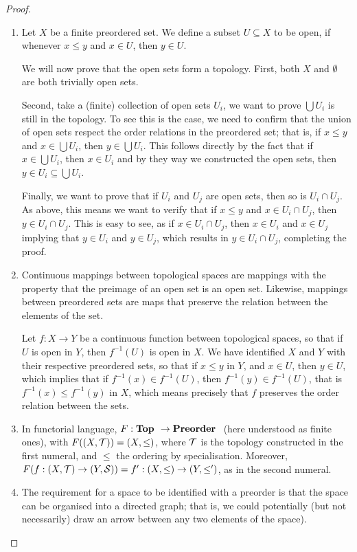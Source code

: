 \begin{proof}
\begin{enumerate}
    \item Let $X$ be a finite preordered set.
    We define a subset $U \subseteq X$ to be open, if whenever $x \leq y$ and $x \in U$, then $y \in U$.

    We will now prove that the open sets form a topology.
    First, both $X$ and $\emptyset$ are both trivially open sets.
    
    Second, take a (finite) collection of open sets $U_i$, we want to prove $\bigcup U_i$ is still in the topology. 
    To see this is the case, we need to confirm that the union of open sets respect the order relations in the preordered set;
    that is, if $x \leq y$ and $x \in \bigcup U_i$, then $y \in \bigcup U_i$.
    This follows directly by the fact that if $x \in \bigcup U_i$, then $x \in U_i$ and by they way we constructed the open sets, then $y \in U_i \subseteq \bigcup U_i$.
    
    Finally, we want to prove that if $U_i$ and $U_j$ are open sets, then so is $U_i \cap U_j$.
    As above, this means we want to verify that if $x \leq y$ and $x \in U_i \cap U_j$, then $y \in U_i \cap U_j$. 
    This is easy to see, as if $x \in U_i \cap U_j$, then $x \in U_i$ and $x \in U_j$ implying that $y \in U_i$ and $y \in U_j$, which results in $y \in U_i \cap U_j$, completing the proof.
    \item Continuous mappings between topological spaces are mappings with the property that the preimage of an open set is an open set.
    Likewise, mappings between preordered sets are maps that preserve the relation between the elements of the set.

    Let $f: X \to Y$ be a continuous function between topological spaces, so that if $U$ is open in $Y$, then $f^{-1}(U)$ is open in $X$. 
    We have identified $X$ and $Y$ with their respective preordered sets, so that if $x 
    \leq y$ in $Y$, and $x \in U$, then $y \in U$, which implies that if $f^{-1}(x) \in f^{-1}(U)$, then $f^{-1}(y) \in f^{-1}(U)$, that is $f^{-1}(x) \leq f^{-1}(y)$ in $X$, which means precisely that $f$ preserves the order relation between the sets.
    \item In functorial language, $F: {\normalfont\textbf{Top }} \to {\normalfont\textbf{Preorder }}$ (here understood as finite ones), with $F((X, \mathcal{T})) = (X, \leq)$, where $\mathcal{T}$ is the topology constructed in the first numeral, and $\leq$ the ordering by specialisation.
    Moreover, $F(f: (X, \mathcal{T}) \to (Y, \mathcal{S})) = f': (X, \leq) \to (Y, \leq')$, as in the second numeral.
    \item The requirement for a space to be identified with a preorder is that the space can be organised into a directed graph;
    that is, we could potentially (but not necessarily) draw an arrow between any two elements of the space).
\end{enumerate}
\end{proof} 

